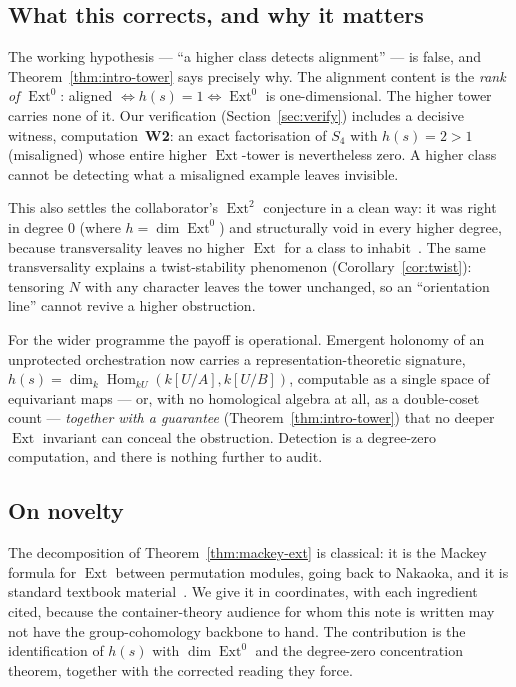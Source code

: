 \documentclass[11pt]{amsart}
\theoremstyle{plain}
\theoremstyle{definition}
\DeclareMathOperator{\Hom}{Hom}
\DeclareMathOperator{\Ext}{Ext}
\begin{document}
\subsection*{What this corrects, and why it matters}
The working hypothesis --- ``a higher class detects alignment'' --- is false, and
Theorem~\ref{thm:intro-tower} says precisely why. The alignment content is the
\emph{rank of $\Ext^0$}: aligned $\iff h(s)=1\iff \Ext^0$ is one-dimensional. The higher
tower carries none of it. Our verification (Section~\ref{sec:verify}) includes a decisive
witness, computation~\textbf{W2}: an exact factorisation of $S_4$ with $h(s)=2>1$
(misaligned) whose entire higher $\Ext$-tower is nevertheless zero. A higher class cannot
be detecting what a misaligned example leaves invisible.

This also settles the collaborator's $\Ext^2$ conjecture in a clean way: it was right in
degree $0$ (where $h=\dim\Ext^0$) and structurally void in every higher degree, because
transversality leaves no higher $\Ext$ for a class to inhabit~\cite{macbeth-rickv4}. The
same transversality explains a twist-stability phenomenon (Corollary~\ref{cor:twist}):
tensoring $N$ with any character leaves the tower unchanged, so an ``orientation line''
cannot revive a higher obstruction.

For the wider programme the payoff is operational. Emergent holonomy of an unprotected
orchestration now carries a representation-theoretic signature,
$h(s)=\dim_k\Hom_{kU}(k[U/A],k[U/B])$, computable as a single space of equivariant maps ---
or, with no homological algebra at all, as a double-coset count --- \emph{together with a
guarantee} (Theorem~\ref{thm:intro-tower}) that no deeper $\Ext$ invariant can conceal the
obstruction. Detection is a degree-zero computation, and there is nothing further to audit.

\subsection*{On novelty}
The decomposition of Theorem~\ref{thm:mackey-ext} is classical: it is the Mackey formula
for $\Ext$ between permutation modules, going back to Nakaoka, and it is standard textbook
material~\cite{benson1,brown}. We give it in coordinates, with each ingredient cited,
because the container-theory audience for whom this note is written may not have the
group-cohomology backbone to hand. The contribution is the identification of $h(s)$ with
$\dim\Ext^0$ and the degree-zero concentration theorem, together with the corrected reading
they force.
\end{document}
